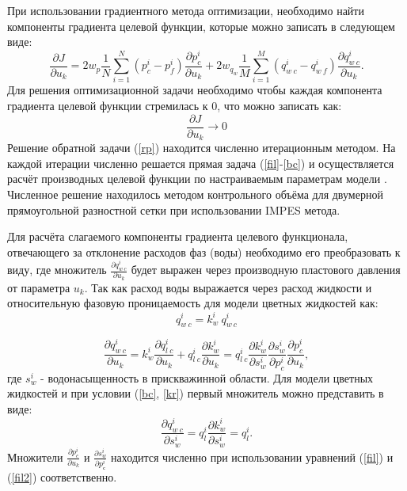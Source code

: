 \documentclass{article}
\begin{document}
При использовании градиентного метода оптимизации, необходимо найти компоненты градиента целевой функции, которые можно записать в следующем виде:
\begin{equation}
\frac{\partial J}{\partial u_k} = 2w_p\frac{1}{N}\sum_{i=1}^N ({p_c^i-p_f^i})\frac{\partial p_c^i}{\partial u_k}+2w_{q_w}\frac{1}{M}\sum_{i=1}^M{\left(q_{w\:c}^i-q_{w\:f}^i\right)}\frac{\partial q_{w\:c}^i}{\partial u_k}.
\end{equation}
Для решения оптимизационной задачи необходимо чтобы каждая компонента градиента целевой функции стремилась к 0, что можно записать как:
\begin{equation} \label{rp}
	 \frac{\partial J}{\partial u_k} \rightarrow 0
\end{equation}
Решение обратной задачи (\ref{rp}) находится численно итерационным методом. На каждой итерации численно решается прямая задача (\ref{fil}-\ref{bc}) и осуществляется расчёт производных целевой функции по настраиваемым параметрам модели \cite{opt}. Численное решение находилось методом контрольного объёма  для двумерной прямоугольной разностной сетки при использовании IMPES метода.

Для расчёта слагаемого компоненты градиента целевого функционала, отвечающего за отклонение расходов фаз (воды) необходимо его преобразовать к виду, где множитель $\frac{\partial q_{w\:c}^i}{\partial u_k}$ будет выражен через производную пластового давления от параметра $u_k$. Так как расход воды выражается через расход жидкости и относительную фазовую проницаемость для модели цветных жидкостей как:
 \begin{equation*}
 	q_{w\:c}^i = k_{w}^i \: q_{w\:c}^i
 \end{equation*}

\begin{equation} \label{dq_du}
\frac{\partial q_{w\:c}^i}{\partial u_k} = k_{w}^i \frac{\partial q_{l\:c}^i}{\partial u_k} + q_{l\:c}^i \frac{\partial k_{w}^i}{\partial u_k} = q_{l\:c}^i \frac{\partial k_{w}^i}{\partial s_w^i} \frac{\partial s_w^i}{\partial p_c^i}\frac{\partial p_c^i}{\partial u_k},
\end{equation}
где $s_w^i$ - водонасыщенность в прискважинной области.
Для модели цветных жидкостей и при условии (\ref{bc}, \ref{kr}) первый множитель можно представить в виде:
\begin{equation}
\frac{\partial q_{w\:c}^i}{\partial s_w^i} = q_l^i\frac{\partial k_{w}^i}{\partial s_w^i} = q_l^i.
\end{equation}
Множители $\frac{\partial p_c^i}{\partial u_k}$ и $\frac{\partial s_w^i}{\partial p_с^i}$ находится численно при использовании уравнений (\ref{fil}) и (\ref{fil2}) соответственно.
\end{document}
